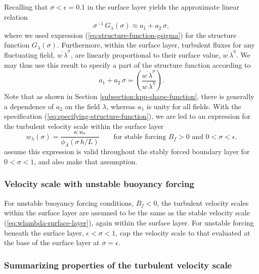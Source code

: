 Recalling that  $\sigma < \epsilon = 0.1$ in the surface
layer yields the approximate linear relation
\begin{equation}
\sigma^{-1} \, G_{\lambda}(\sigma)  \approx a_{1} + a_{2} \, \sigma,  
\end{equation}
where we used expression (\ref{eq:structure-function-gsigma}) for the
structure function $G_{\lambda}(\sigma)$.  Furthermore, within the
surface layer, turbulent fluxes for any fluctuating field,
$\overline{w \, \lambda}^{\sigma}$, are linearly proportional to their
surface value, $\overline{w \, \lambda}^{\eta}$.  We may thus use this
result to specify a part of the structure function according to
\begin{equation}
  a_{1} + a_{2} \, \sigma = \left( \frac{ \overline{w \, \lambda}^{\sigma}}{\overline{w \, \lambda}^{\eta}} \right).
\label{eq:specifying-structure-function}
\end{equation}
Note that as shown in Section \ref{subsection:kpp-shape-function},
there is generally a dependence of $a_{2}$ on the field $\lambda$,
whereas $a_{1}$ is unity for all fields.  With the specification
(\ref{eq:specifying-structure-function}), we are led to an expression
for the turbulent velocity scale within the surface layer
\begin{equation}
  w_{\lambda}(\sigma)  = \frac{\kappa \,  u_{*}}{\phi_{\Lambda}(\sigma  \, h/L)}   
 \qquad \mbox{for stable forcing $B_{f} > 0$ and $0 < \sigma < \epsilon$.}
\label{eq:wlambda-surface-layer}
\end{equation}
\cite{Troen_Mahrt1986} assume this expression is valid throughout the
stably forced boundary layer for $0 < \sigma < 1$, and \cite{LargeKPP}
also make that assumption.


\subsubsection{Velocity scale with unstable buoyancy forcing}

For unstable buoyancy forcing conditions, $B_{f} < 0$, the turbulent
velocity scales within the surface layer are assumed to be the same as
the stable velocity scale (\ref{eq:wlambda-surface-layer}), again
within the surface layer.  For unstable forcing beneath the surface
layer, $\epsilon < \sigma < 1$, \cite{LargeKPP} cap the velocity scale
to that evaluated at the base of the surface layer at $\sigma =
\epsilon$.  

\subsubsection{Summarizing properties of the turbulent velocity scale}

